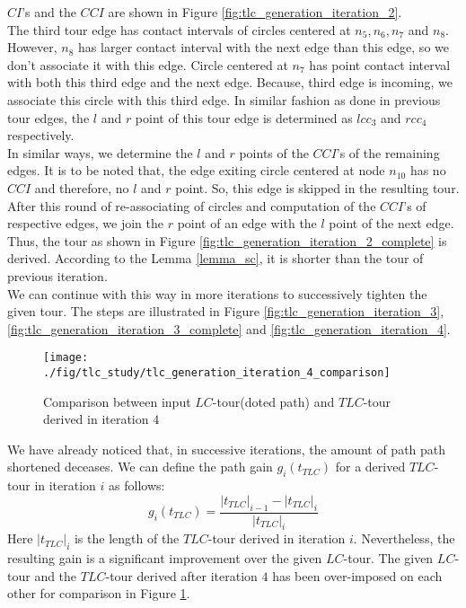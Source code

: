 \documentclass{llncs}
\begin{document}
$CI$'s and the $CCI$ are shown in Figure \ref{fig:tlc_generation_iteration_2}. \\
The third tour edge has contact intervals of circles centered
at $n_5, n_6, n_7$ and $n_8$. However, $n_8$ has larger contact interval with the next edge than
this edge, so we don't associate it with this edge. Circle centered at $n_7$ has point contact
interval with both this third edge and the next edge. Because, third edge is incoming, we associate
this circle with this third edge. In similar fashion as done in previous tour edges, the $l$ and $r$
point of this tour edge is determined as $lcc_3$ and $rcc_4$ respectively. \\
In similar ways, we determine the $l$ and $r$ points of the $CCI$'s  of the remaining edges. It is
to be noted that, the edge exiting circle centered at node $n_{10}$ has no $CCI$ and therefore, no
$l$ and $r$ point. So, this edge is  skipped in the resulting tour. After this round of
re-associating of circles and computation of the $CCI$'s of respective edges, we
join the $r$ point of an edge with the $l$ point of the next edge. Thus, the tour as
shown in Figure \ref{fig:tlc_generation_iteration_2_complete} is derived. According to the Lemma
\ref{lemma_sc}, it is shorter than the tour of previous iteration.\\
We can continue with this way in more iterations to successively tighten the given tour. The
steps are illustrated in Figure \ref{fig:tlc_generation_iteration_3},
\ref{fig:tlc_generation_iteration_3_complete} and \ref{fig:tlc_generation_iteration_4}.\\
\begin{figure}[hbt!]    
  \centering   
    \texttt{[image: ./fig/tlc\_study/tlc\_generation\_iteration\_4\_comparison]} 
     \caption{Comparison between input $LC$-tour(doted path) and $TLC$-tour derived in iteration
     $4$}
     \label{fig:tlc_generation_iteration_4_comparison}   
\end{figure}
We have already noticed that, in successive iterations, the amount of path path shortened deceases.
We can define the path gain $g_i(t_{TLC})$ for a derived $TLC$-tour in iteration $i$ as follows:
\begin{equation}
	g_i(t_{TLC})=\frac{|t_{TLC}|_{i-1}-|t_{TLC}|_i}{|t_{TLC}|_{i}}
	\label{eqn:path_gain}
\end{equation}
Here $|t_{TLC}|_{i}$ is the length of the $TLC$-tour derived in iteration $i$. Nevertheless, the
resulting gain is a significant improvement over the given $LC$-tour. The given $LC$-tour and the
$TLC$-tour derived after iteration $4$ has been over-imposed on each other for comparison in Figure
\ref{fig:tlc_generation_iteration_4_comparison}.
\end{document}
